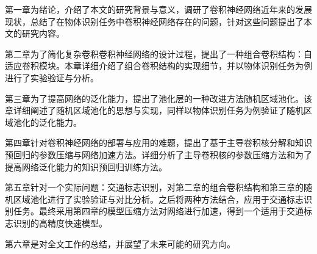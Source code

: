 第一章为绪论，介绍了本文的研究背景与意义，调研了卷积神经网络近年来的发展现状，总结了在物体识别任务中卷积神经网络存在的问题，针对这些问题提出了本文的研究内容。

第二章为了简化复杂卷积卷积神经网络的设计过程，提出了一种组合卷积结构：自适应卷积模块。本章详细介绍了组合卷积结构的实现细节，并以物体识别任务为例进行了实验验证与分析。

第三章为了提高网络的泛化能力，提出了池化层的一种改进方法随机区域池化。该章详细阐述了随机区域池化的思想与实现，同样以物体识别任务为例验证了随机区域池化的泛化能力。

第四章针对卷积神经网络的部署与应用的难题，提出了基于主导卷积核分解和知识预回归的参数压缩与网络加速方法。详细分析了主导卷积核的参数压缩方法和为了提高网络泛化能力的知识预回归训练方法。

第五章针对一个实际问题：交通标志识别，对第二章的组合卷积结构和第三章的随机区域池化进行了实验验证与对比分析。之后将两种方法结合，应用于交通标志识别任务。最终采用第四章的模型压缩方法对网络进行加速，得到一个适用于交通标志识别的高精度快速模型。

第六章是对全文工作的总结，并展望了未来可能的研究方向。

